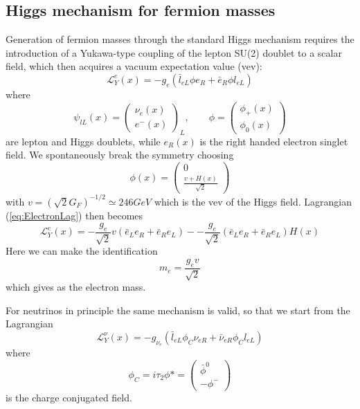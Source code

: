 \documentclass{subnucbo}
\begin{document}
\subsection{Higgs mechanism for fermion masses}
Generation of fermion masses through the standard Higgs mechanism requires the introduction of a Yukawa-type coupling of the lepton SU(2) doublet to a scalar field, which then acquires a vacuum expectation value (vev): 
\begin{equation}
\label{eq:ElectronLag}
\mathcal{L}_Y^e(x)=-g_e(\bar{l}_{eL}\phi e_R+\bar{e}_R\phi l_{eL})
\end{equation}
where
\begin{equation}
\psi_{lL}(x)=\begin{pmatrix}\nu_{e}(x)\\ e^-(x) \end{pmatrix}_L,\qquad
\phi=\begin{pmatrix}\phi_+(x)\\ \phi_0(x) \end{pmatrix}
\end{equation}
are lepton and Higgs doublets, while $e_R(x)$ is the right handed electron singlet field.
We spontaneously break the symmetry choosing 
\begin{equation}
\phi(x)=\begin{pmatrix}0\\ \frac{v+H(x)}{\sqrt{2}}\end{pmatrix}
\end{equation}
with $v=(\sqrt{2}G_F)^{-1/2}\simeq246GeV$ which is the vev of the Higgs field.
Lagrangian (\ref{eq:ElectronLag}) then becomes
\begin{equation}
\mathcal{L}_Y^e(x)=-\frac{g_e}{\sqrt{2}}v(\bar{e}_Le_R+\bar{e}_Re_L)--\frac{g_e}{\sqrt{2}}(\bar{e}_Le_R+\bar{e}_Re_L)H(x)
\end{equation}
Here we can make the identification 
\begin{equation}
m_e=\frac{g_ev}{\sqrt{2}}
\end{equation}
which gives as the electron mass.

For neutrinos in principle the same mechanism is valid, so that we start from the Lagrangian
\begin{equation}
\mathcal{L}_Y^{\nu}(x)=-g_{\nu_e}(\bar{l}_{eL}\phi_C \nu_{eR}+\bar{\nu}_{eR}\phi_C l_{eL})
\end{equation}
where
\begin{equation}
\phi_C=i\tau_2\phi*=\begin{pmatrix}\bar{\phi}^0 \\ -\phi^-\end{pmatrix}
\end{equation}
is the charge conjugated field.
\end{document}
